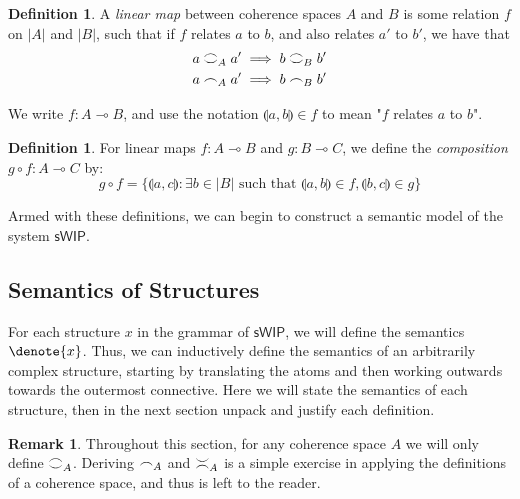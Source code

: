 \documentclass[12pt, oneside]{article}
\theoremstyle{plain}
\theoremstyle{definition}
\newtheorem{definition}[theorem]{Definition}
\newtheorem*{remark}{Remark}
\DeclarePairedDelimiter\denote\llbracket\rrbracket
\newcommand{\lp}{\llparenthesis}
\newcommand{\rp}{\rrparenthesis}
\newcommand{\sSys}{{\mathsf{sWIP}}}%
\newcommand{\coh}[1][]{\mathrel{\vcenter{\offinterlineskip\hbox{$\frown$}\vskip0.2ex\hbox{$\smile$}}_{\ifx\\#1\\\else#1\fi}}}
\newcommand{\incoh}[1][]{\mathrel{\vcenter{\offinterlineskip\hbox{$\smile$}\vskip0.2ex\hbox{$\frown$}}_{\ifx\\#1\\\else#1\fi}}}
\newcommand{\scoh}[1][]{\mathrel{\frown}_{\ifx\\#1\\\else#1\fi}}
\newcommand{\comp}{\mathbin{\circ}}
\begin{document}
\begin{definition}
    A \textit{linear map} between coherence spaces $A$ and $B$ is some relation $f$ on $|A|$ and $|B|$,
    such that if $f$ relates $a$ to $b$, and also relates $a'$ to $b'$, we have that
    \begin{align*}
        a \coh[A] a' &\implies b \coh[B] b' \\
        a \scoh[A] a' &\implies b \scoh[B] b'
    \end{align*}

    We write $f:A\multimap B$, and use the notation $\lp a,b\rp\in f$ to mean "$f$ relates $a$ to $b$".
\end{definition}

\begin{definition}
    For linear maps $f:A\multimap B$ and $g:B\multimap C$, we define the \textit{composition} $g\comp f:A\multimap C$ by:
    $$g\comp f = \{\lp a,c\rp:\exists b\in|B|\text{ such that }\lp a,b\rp\in f, \lp b,c\rp\in g\}$$
\end{definition}

Armed with these definitions, we can begin to construct a semantic model of the system $\sSys$.

\subsection{Semantics of Structures}

For each structure $x$ in the grammar of $\sSys$, we will define the semantics $\denote{x}$.
Thus, we can inductively define the semantics of an arbitrarily complex structure, starting by translating the atoms and then working outwards towards the outermost connective.
Here we will state the semantics of each structure, then in the next section unpack and justify each definition.

\begin{remark}
    Throughout this section, for any coherence space $A$ we will only define $\coh[A]$.
    Deriving $\scoh[A]$ and $\incoh[A]$ is a simple exercise in applying the definitions of a coherence space, and thus is left to the reader.
\end{remark}
\end{document}
